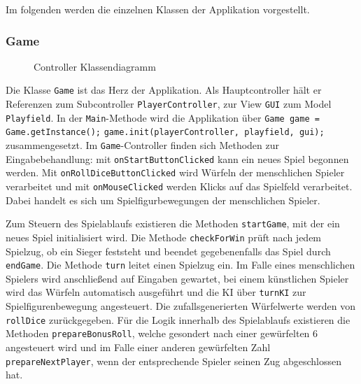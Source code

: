 \documentclass[conference]{IEEEtran}
\begin{document}
  Im folgenden werden die einzelnen Klassen der Applikation vorgestellt.

\subsubsection{Game}
\begin{figure}[]
    \centering
    \caption{Controller Klassendiagramm}
\end{figure}


Die Klasse \texttt{Game} ist das Herz der Applikation. Als Hauptcontroller h\"alt er Referenzen zum Subcontroller \texttt{PlayerController}, zur View \texttt{GUI} zum Model \texttt{Playfield}. In der \texttt{Main}-Methode wird die Applikation \"uber\newline
\texttt{Game game = Game.getInstance();}\newline
\texttt{game.init(playerController, playfield, gui);}\newline
zusammengesetzt. Im \texttt{Game}-Controller finden sich Methoden zur Eingabebehandlung: mit \texttt{onStartButtonClicked} kann ein neues Spiel begonnen werden. Mit \texttt{onRollDiceButtonClicked} wird W\"urfeln der menschlichen Spieler verarbeitet und mit \texttt{onMouseClicked} werden Klicks auf das Spielfeld verarbeitet. Dabei handelt es sich um Spielfigurbewegungen der menschlichen Spieler.

Zum Steuern des Spielablaufs existieren die Methoden \texttt{startGame}, mit der ein neues Spiel initialisiert wird.
Die Methode \texttt{checkForWin} pr\"uft nach jedem Spielzug, ob ein Sieger feststeht und beendet gegebenenfalls das Spiel durch
\texttt{endGame}.
Die Methode \texttt{turn} leitet einen Spielzug ein. Im Falle eines menschlichen Spielers wird anschlie\ss end auf Eingaben gewartet, bei einem k\"unstlichen Spieler wird das W\"urfeln automatisch ausgef\"uhrt und die KI \"uber \texttt{turnKI} zur Spielfigurenbewegung angesteuert. Die zufallsgenerierten W\"urfelwerte
werden von \texttt{rollDice} zur\"uckgegeben. F\"ur die Logik innerhalb des Spielablaufs existieren die Methoden
\texttt{prepareBonusRoll}, welche gesondert nach einer gew\"urfelten 6 angesteuert wird und im Falle einer anderen gew\"urfelten Zahl
\texttt{prepareNextPlayer}, wenn der entsprechende Spieler seinen Zug abgeschlossen hat.
\end{document}
